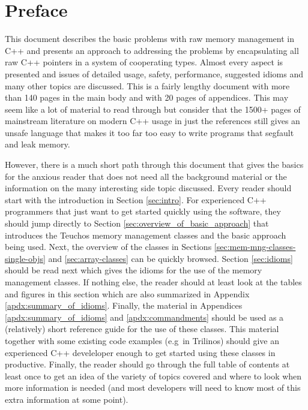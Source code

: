 \documentclass[pdf,ps2pdf,11pt]{SANDreport}
\begin{document}
%
\cleardoublepage   %
\tableofcontents
\listoffigures
\listoftables


\clearpage
\section*{Preface}

This document describes the basic problems with raw memory management
in C++ and presents an approach to addressing the problems by
encapsulating all raw C++ pointers in a system of cooperating types.
Almost every aspect is presented and issues of detailed usage, safety,
performance, suggested idioms and many other topics are discussed.
This is a fairly lengthy document with more than 140 pages in the main
body and with 20 pages of appendices.  This may seem like a lot of
material to read through but consider that the 1500+ pages of
mainstream literature on modern C++ usage in just the references
{}\cite{stroustrup97, C++CodingStandards05, C++Gotchas03,
EffectiveC++ThirdEdition} still gives an unsafe language that makes it
too far too easy to write programs that segfault and leak memory.

However, there is a much short path through this document that gives
the basics for the anxious reader that does not need all the
background material or the information on the many interesting side
topic discussed.  Every reader should start with the introduction in
Section {}\ref{sec:intro}.  For experienced C++ programmers that just
want to get started quickly using the software, they should jump
directly to Section {}\ref{sec:overview_of_basic_approach} that
introduces the Teuchos memory management classes and the basic
approach being used.  Next, the overview of the classes in Sections
{}\ref{sec:mem-mng-classes-single-objs} and {}\ref{sec:array-classes}
can be quickly browsed.  Section {}\ref{sec:idioms} should be read
next which gives the idioms for the use of the memory management
classes.  If nothing else, the reader should at least look at the
tables and figures in this section which are also summarized in
Appendix {}\ref{apdx:summary_of_idioms}.  Finally, the material in
Appendices {}\ref{apdx:summary_of_idioms} and
{}\ref{apdx:commandments} should be used as a (relatively) short
reference guide for the use of these classes.  This material together
with some existing code examples (e.g\ in Trilinos) should give an
experienced C++ develeloper enough to get started using these classes
in productive.  Finally, the reader should go through the full table
of contents at least once to get an idea of the variety of topics
covered and where to look when more information is needed (and most
developers will need to know most of this extra information at some
point).
\end{document}
